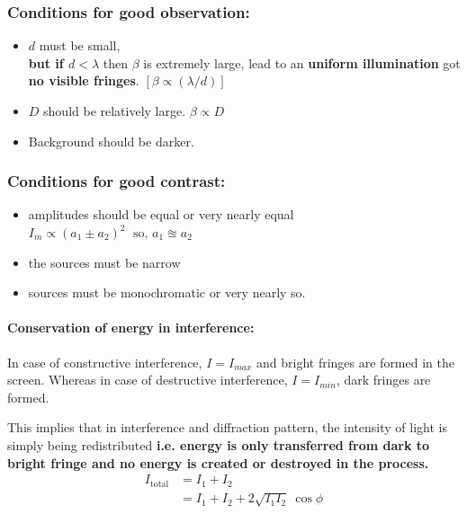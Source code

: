 \documentclass[legalpaper,10pt]{article}
\begin{document}
\begin{multicols*}{2}
		\subsubsection*{Conditions for good observation:}
		\begin{itemize}
			\item \(d\) must be small,\\\textbf{but if \({d<\lambda}\)} then $\beta$ is extremely large, lead to an \textbf{uniform illumination} got \textbf{no visible fringes}. \([\beta\propto(\lambda/d)]\)
			\item \(D\) should be relatively large. \(\beta \varpropto  D \)
			\item Background should be darker.
		\end{itemize}
		\subsubsection*{Conditions for good  contrast:}
		\begin{itemize}
			\item amplitudes should be equal or very nearly equal \(I_{m} \propto (a_1 \pm a_2)^2\; \text{  so, }a_1 \approxeq a_2\)
			\item the sources must be narrow
			\item sources must be monochromatic or very nearly so.
		\end{itemize}
		\paragraph*{Conservation of energy in interference:}In case of constructive interference, $I=I_{max}$ and bright fringes are formed in the screen. Whereas in case of destructive interference, $I=I_{min}$, dark fringes are formed.
		\par This implies that in interference and diffraction pattern, the intensity of light is simply being redistributed \textbf{i.e. energy is only transferred from dark to bright fringe and no energy is created or destroyed in the process.}
		\begin{align*}
			I_\text{total} & = I_1 + I_2                             \\
			& = I_1 + I_2 + 2\sqrt{I_1 I_2}\ \cos\phi
		\end{align*}
		
		

\end{multicols*}
\end{document}
